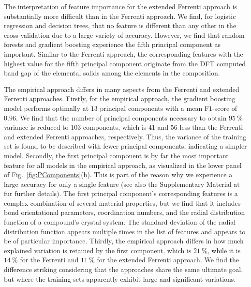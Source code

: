 \documentclass[superscriptaddress,unsortedaddress,
 amsmath,amssymb,
 aps,
]{revtex4-2}
\begin{document}
The interpretation of feature importance for the extended Ferrenti approach is substantially more difficult than in the Ferrenti approach. We find, for logistic regression and decision trees, that no feature is different than any other in the cross-validation due to a large variety of accuracy. However, we find that random forests and gradient boosting experience the fifth principal component as important. Similar to the Ferrenti approach, the corresponding features with the highest value for the fifth principal component originate from the DFT computed band gap of the elemental solids among the elements in the composition. 

The empirical approach differs in many aspects from the Ferrenti and extended Ferrenti approaches. 
Firstly, for the empirical approach, the gradient boosting model performs optimally at $13$ principal components with a mean F$1$-score of $0.96$. 
We find that the number of principal components necessary to obtain $95 \ \%$ variance is reduced to $103$ components, which is $41$ and $56$ less than the Ferrenti and extended Ferrenti approaches, respectively. Thus, the variance of the training set is found to be described with fewer principal components, indicating a simpler model.   
Secondly, the first principal component is by far the most important feature for all models in the empirical approach, as visualized in the lower panel of Fig.~\ref{fig:PComponents}(b). 
This is part of the reason why we experience a large accuracy for only a single feature (see also the Supplementary Material at \cite{supplementary} fur further details). The first principal component's corresponding features is a complex combination of several material properties, but we find that it includes bond orientational parameters, coordination numbers, and the radial distribution function of a compound's crystal system. 
The standard deviation of the radial distribution function appears multiple times in the list of features and appears to be of particular importance. 
Thirdly, the empirical approach differs in how much explained variation is retained by the first component, which is $21 \ \%$, while it is $14 \ \%$ for the Ferrenti  and $11 \ \%$ for the extended Ferrenti approach. We find the difference striking considering that the approaches share the same ultimate goal, but where the training sets apparently exhibit large and significant variations. 
\end{document}
